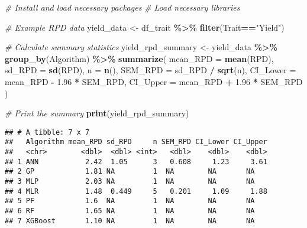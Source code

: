 \documentclass[
]{article}
\newenvironment{Shaded}{\begin{snugshade}}{\end{snugshade}}
\newcommand{\AttributeTok}[1]{\textcolor[rgb]{0.13,0.29,0.53}{#1}}
\newcommand{\CommentTok}[1]{\textcolor[rgb]{0.56,0.35,0.01}{\textit{#1}}}
\newcommand{\FloatTok}[1]{\textcolor[rgb]{0.00,0.00,0.81}{#1}}
\newcommand{\FunctionTok}[1]{\textcolor[rgb]{0.13,0.29,0.53}{\textbf{#1}}}
\newcommand{\NormalTok}[1]{#1}
\newcommand{\OtherTok}[1]{\textcolor[rgb]{0.56,0.35,0.01}{#1}}
\newcommand{\SpecialCharTok}[1]{\textcolor[rgb]{0.81,0.36,0.00}{\textbf{#1}}}
\newcommand{\StringTok}[1]{\textcolor[rgb]{0.31,0.60,0.02}{#1}}
\begin{document}
\begin{Shaded}
\begin{Highlighting}[]
\CommentTok{\# Install and load necessary packages}
\CommentTok{\# Load necessary libraries}

\CommentTok{\# Example RPD data}
\NormalTok{yield\_data }\OtherTok{\textless{}{-}}\NormalTok{ df\_trait }\SpecialCharTok{\%\textgreater{}\%} \FunctionTok{filter}\NormalTok{(Trait}\SpecialCharTok{==}\StringTok{"Yield"}\NormalTok{)}

\CommentTok{\# Calculate summary statistics}
\NormalTok{yield\_rpd\_summary }\OtherTok{\textless{}{-}}\NormalTok{ yield\_data }\SpecialCharTok{\%\textgreater{}\%}
  \FunctionTok{group\_by}\NormalTok{(Algorithm) }\SpecialCharTok{\%\textgreater{}\%}
  \FunctionTok{summarize}\NormalTok{(}
    \AttributeTok{mean\_RPD =} \FunctionTok{mean}\NormalTok{(RPD),}
    \AttributeTok{sd\_RPD =} \FunctionTok{sd}\NormalTok{(RPD),}
    \AttributeTok{n =} \FunctionTok{n}\NormalTok{(),}
    \AttributeTok{SEM\_RPD =}\NormalTok{ sd\_RPD }\SpecialCharTok{/} \FunctionTok{sqrt}\NormalTok{(n),}
    \AttributeTok{CI\_Lower =}\NormalTok{ mean\_RPD }\SpecialCharTok{{-}} \FloatTok{1.96} \SpecialCharTok{*}\NormalTok{ SEM\_RPD,}
    \AttributeTok{CI\_Upper =}\NormalTok{ mean\_RPD }\SpecialCharTok{+} \FloatTok{1.96} \SpecialCharTok{*}\NormalTok{ SEM\_RPD}
\NormalTok{  )}

\CommentTok{\# Print the summary}
\FunctionTok{print}\NormalTok{(yield\_rpd\_summary)}
\end{Highlighting}
\end{Shaded}

\begin{verbatim}
## # A tibble: 7 x 7
##   Algorithm mean_RPD sd_RPD     n SEM_RPD CI_Lower CI_Upper
##   <chr>        <dbl>  <dbl> <int>   <dbl>    <dbl>    <dbl>
## 1 ANN           2.42  1.05      3   0.608     1.23     3.61
## 2 GP            1.81 NA         1  NA        NA       NA   
## 3 MLP           2.03 NA         1  NA        NA       NA   
## 4 MLR           1.48  0.449     5   0.201     1.09     1.88
## 5 PF            1.6  NA         1  NA        NA       NA   
## 6 RF            1.65 NA         1  NA        NA       NA   
## 7 XGBoost       1.10 NA         1  NA        NA       NA
\end{verbatim}
\end{document}
